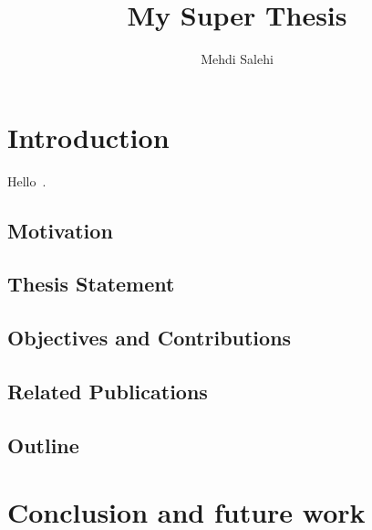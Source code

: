\documentclass[letterpaper,12pt,onecolumn,final]{report}
\author{Mehdi Salehi}
\title{My Super Thesis}
\begin{document}
\begin{abstract}
{%

}
\end{abstract}

\begin{acknowledgments}

\end{acknowledgments}


\chapter{Introduction}

Hello~\cite{cold-boot-attack}.

\section{Motivation}


\section{Thesis Statement}


\section{Objectives and Contributions}


\section{Related Publications}


\section{Outline}











\chapter{Conclusion and future work}
\label{chap:conclusion}
\end{document}
